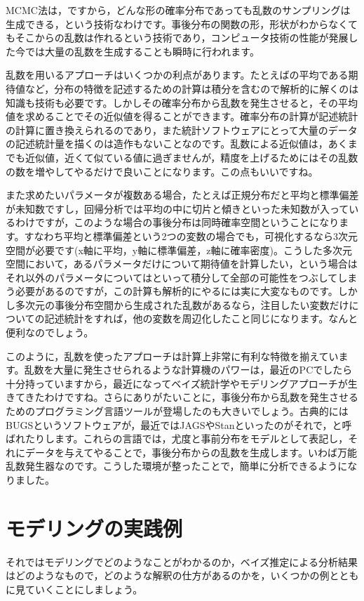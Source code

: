 \documentclass{ltjsbook}
\begin{document}
MCMC法は，ですから，どんな形の確率分布であっても乱数のサンプリングは生成できる，という技術なわけです。事後分布の関数の形，形状がわからなくてもそこからの乱数は作れるという技術であり，コンピュータ技術の性能が発展した今では大量の乱数を生成することも瞬時に行われます。

乱数を用いるアプローチはいくつかの利点があります。たとえばの平均である期待値など，分布の特徴を記述するための計算は積分を含むので解析的に解くのは知識も技術も必要です。しかしその確率分布から乱数を発生させると，その平均値を求めることでその近似値を得ることができます。確率分布の計算が記述統計の計算に置き換えられるのであり，また統計ソフトウェアにとって大量のデータの記述統計量を描くのは造作もないことなのです。乱数による近似値は，あくまでも近似値，近くて似ている値に過ぎませんが，精度を上げるためにはその乱数の数を増やしてやるだけで良いことになります。この点もいいですね。

また求めたいパラメータが複数ある場合，たとえば正規分布だと平均と標準偏差が未知数ですし，回帰分析では平均の中に切片と傾きといった未知数が入っているわけですが，このような場合の事後分布は同時確率空間ということになります。すなわち平均と標準偏差という2つの変数の場合でも，可視化するなら3次元空間が必要です(x軸に平均，y軸に標準偏差，z軸に確率密度)。こうした多次元空間において，あるパラメータだけについて期待値を計算したい，という場合はそれ以外のパラメータについてはといって積分して全部の可能性をつぶしてしまう必要があるのですが，この計算も解析的にやるには実に大変なものです。しかし多次元の事後分布空間から生成された乱数があるなら，注目したい変数だけについての記述統計をすれば，他の変数を周辺化したこと同じになります。なんと便利なのでしょう。

このように，乱数を使ったアプローチは計算上非常に有利な特徴を揃えています。乱数を大量に発生させられるような計算機のパワーは，最近のPCでしたら十分持っていますから，最近になってベイズ統計学やモデリングアプローチが生きてきたわけですね。さらにありがたいことに，事後分布から乱数を発生させるためのプログラミング言語ツールが登場したのも大きいでしょう。古典的にはBUGSというソフトウェアが，最近ではJAGSやStanといったのがそれで，と呼ばれたりします。これらの言語では，尤度と事前分布をモデルとして表記し，それにデータを与えてやることで，事後分布からの乱数を生成します。いわば万能乱数発生器なのです。こうした環境が整ったことで，簡単に分析できるようになりました。

\section{モデリングの実践例}
それではモデリングでどのようなことがわかるのか，ベイズ推定による分析結果はどのようなもので，どのような解釈の仕方があるのかを，いくつかの例とともに見ていくことにしましょう。
\end{document}
